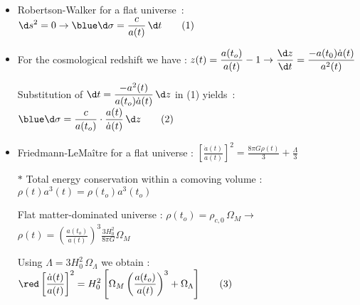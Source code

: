 \Tr
\begin{itemize}
\item Robertson-Walker for a flat universe~: $\displaystyle \d s^{2}=0
      \rightarrow {\blue \d\sigma=\frac{c}{a(t)}\,\d t} \qquad (1)$
\item For the cosmological redshift we have :
      $\displaystyle z(t)=\frac{a(t_{o})}{a(t)}-1
       \rightarrow \frac{\d z}{\d t}=\frac{-a(t_{0})\dot{a}(t)}{a^{2}(t)}$
\item[] Substitution of $\displaystyle \d t=\frac{-a^{2}(t)}{a(t_{o})\dot{a}(t)}\,\d z$ in (1) yields~:
        ${\blue \displaystyle \d\sigma=\frac{c}{a(t_{o})}\cdot\frac{a(t)}{\dot{a}(t)}\,\d z} \qquad (2)$
\item Friedmann-LeMa\^{i}tre for a flat universe : {\red $\displaystyle
      \left[\frac{\dot{a}(t)}{a(t)}\right]^{2}=\frac{8\pi G\rho(t)}{3}+\frac{\Lambda}{3}$}
\item[$\ast$] Total energy conservation within a comoving volume : $\rho(t)a^{3}(t)=\rho(t_{o})a^{3}(t_{o})$
\item[] Flat matter-dominated universe : $\rho(t_{o})=\rho_{c,0}\,\Omega_{M} \rightarrow$
       {\blue $\displaystyle \rho(t)=\left(\frac{a(t_{o})}{a(t)}\right)^{3}\frac{3H_{0}^{2}}{8\pi G}\Omega_{M}$}
\item[] Using {\blue $\Lambda=3H_{0}^{2}\,\Omega_{\Lambda}$} we obtain : ${\red \displaystyle
        \left[\frac{\dot{a}(t)}{a(t)}\right]^{2}
        =H_{0}^{2} \left[\Omega_{M}\left(\frac{a(t_{o})}{a(t)}\right)^{3}+\Omega_{\Lambda}\right]} \qquad (3)$
\end{itemize}

